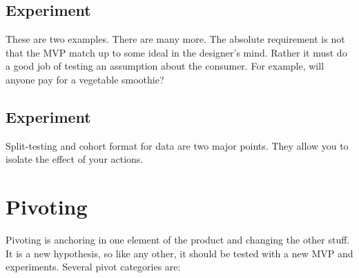 \documentclass[11pt, oneside]{article}   	%
\begin{document}
 \subsection{Experiment}
 
 These are two examples.  There are many more.  The absolute requirement is not that the MVP match up to some ideal in the designer's mind.  Rather it must do a good job of testing an assumption about the consumer.  For example, will anyone pay for a vegetable smoothie?


\subsection{Experiment}

Split-testing and cohort format for data are two major points.  They allow you to isolate the effect of your actions.

\section{Pivoting}

Pivoting is anchoring in one element of the product and changing the other stuff.  It is a new hypothesis, so like any other, it should be tested with a new MVP and experiments.  Several pivot categories are:
\end{document}
